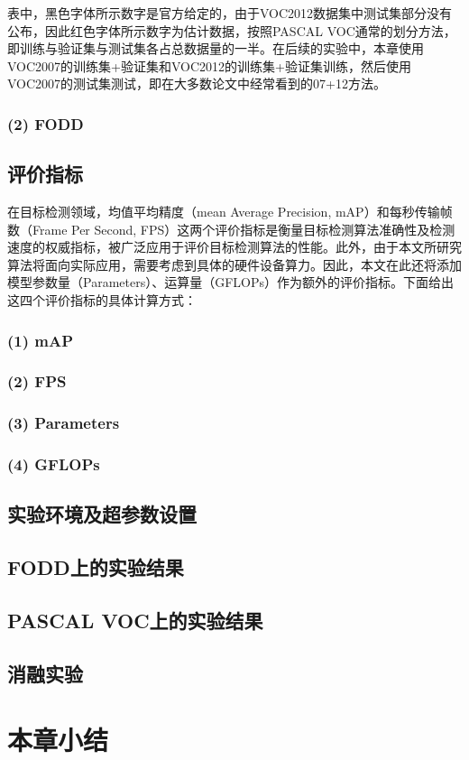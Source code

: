 表中，黑色字体所示数字是官方给定的，由于VOC2012数据集中测试集部分没有公布，因此红色字体所示数字为估计数据，按照PASCAL VOC通常的划分方法，即训练与验证集与测试集各占总数据量的一半。在后续的实验中，本章使用VOC2007的训练集+验证集和VOC2012的训练集+验证集训练，然后使用VOC2007的测试集测试，即在大多数论文中经常看到的07+12方法。
\subsubsection*{(2) FODD}

\subsection{评价指标}
在目标检测领域，均值平均精度（mean Average Precision, mAP）和每秒传输帧数（Frame Per Second, FPS）这两个评价指标是衡量目标检测算法准确性及检测速度的权威指标，被广泛应用于评价目标检测算法的性能。此外，由于本文所研究算法将面向实际应用，需要考虑到具体的硬件设备算力。因此，本文在此还将添加模型参数量（Parameters）、运算量（GFLOPs）作为额外的评价指标。下面给出这四个评价指标的具体计算方式：
\subsubsection*{(1) mAP}
\subsubsection*{(2) FPS}
\subsubsection*{(3) Parameters}
\subsubsection*{(4) GFLOPs}
\subsection{实验环境及超参数设置}
\subsection{FODD上的实验结果}
\subsection{PASCAL VOC上的实验结果}
\subsection{消融实验}

\section{本章小结}
